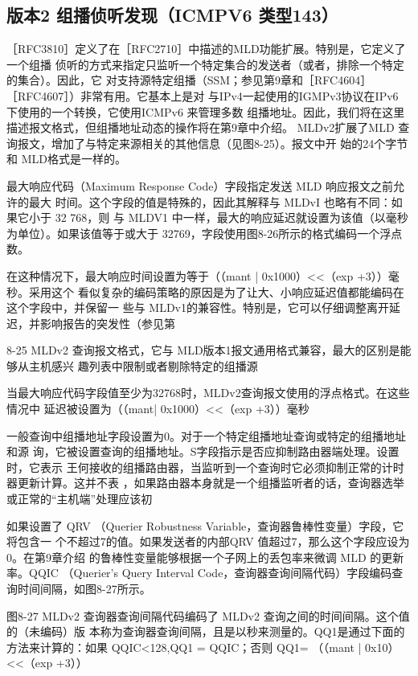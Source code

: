 \subsection{版本2 组播侦听发现（ICMPV6 类型143）}
［RFC3810］定义了在［RFC2710］中描述的MLD功能扩展。特别是，它定义了一个组播
侦听的方式来指定只监听一个特定集合的发送者（或者，排除一个特定的集合）。因此，它
对支持源特定组播（SSM；参见第9章和［RFC4604］［RFC4607］）非常有用。它基本上是对
与IPv4一起使用的IGMPv3协议在IPv6 下使用的一个转换，它使用ICMPv6 来管理多数
组播地址。因此，我们将在这里描述报文格式，但组播地址动态的操作将在第9章中介绍。
MLDv2扩展了MLD 查询报文，增加了与特定来源相关的其他信息（见图8-25）。报文中开
始的24个字节和 MLD格式是一样的。

最大响应代码（Maximum Response Code）字段指定发送 MLD 响应报文之前允许的最大
时间。这个字段的值是特殊的，因此其解释与 MLDvI 也略有不同：如果它小于 32 768，则
与 MLDV1 中一样，最大的响应延迟就设置为该值（以毫秒为单位）。如果该值等于或大于
32769，字段使用图8-26所示的格式编码一个浮点数。

在这种情况下，最大响应时间设置为等于（（mant | 0x1000）<<（exp +3））毫秒。采用这个
看似复杂的编码策略的原因是为了让大、小响应延迟值都能编码在这个字段中，并保留一
些与 MLDv1的兼容性。特别是，它可以仔细调整离开延迟，并影响报告的突发性（参见第

8-25 MLDv2 查询报文格式，它与 MLD版本1报文通用格式兼容，最大的区别是能够从主机感兴
趣列表中限制或者剔除特定的组播源

当最大响应代码字段值至少为32768时，MLDv2查询报文使用的浮点格式。在这些情况中
延迟被设置为（（mant| 0x1000）<<（exp +3））毫秒

一般查询中组播地址字段设置为0。对于一个特定组播地址查询或特定的组播地址和源
询，它被设置查询的组播地址。S字段指示是否应抑制路由器端处理。设置时，它表示
王何接收的组播路由器，当监听到一个查询时它必须抑制正常的计时器更新计算。这并不表
，如果路由器本身就是一个组播监听者的话，查询器选举或正常的“主机端”处理应该初

如果设置了 QRV （Querier Robustness Variable，查询器鲁棒性变量）字段，它将包含一
个不超过7的值。如果发送者的内部QRV 值超过7，那么这个字段应设为0。在第9章介绍
的鲁棒性变量能够根据一个子网上的丢包率来微调 MLD 的更新率。QQIC （Querier’s Query
Interval Code，查询器查询间隔代码）字段编码查询时间间隔，如图8-27所示。


图8-27 MLDv2 查询器查询间隔代码编码了 MLDv2 查询之间的时间间隔。这个值的（未编码）版
本称为查询器查询间隔，且是以秒来测量的。QQ1是通过下面的方法来计算的：如果
QQIC<128,QQ1 = QQIC；否则 QQ1= （（mant | 0x10）<<（exp +3））

